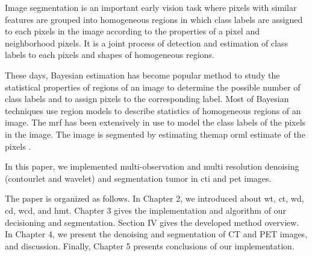 Image segmentation is an important early vision task where pixels with similar features are grouped into homogeneous regions in which  class labels are assigned to each pixels in the image according to the properties of a pixel and neighborhood pixels. It is a joint process of detection and estimation of class labels to each pixels and shapes of homogeneous regions. 

These days, Bayesian estimation has become popular method to study the statistical properties of regions of an image to determine the possible number of class labels and to assign pixels to the corresponding label. Most of Bayesian techniques use region models to describe statistics of homogeneous regions of an image. The \gls{mrf} has been extensively in use to model the class labels of the pixels in the image. The image is segmented by estimating the\gls{map}  or\gls{ml} estimate of the pixels\cite{choi1999image} \cite{voisin2014supervised}.

In this paper, we implemented  multi-observation and multi resolution  denoising (contourlet and wavelet) and segmentation tumor in \gls{cti} and \gls{pet} images.

The paper is organized as follows. In Chapter 2, we introduced about \gls{wt}, \gls{ct}, \gls{wd}, \gls{cd}, \gls{wcd}, and \gls{hmt}. Chapter 3 gives the implementation and algorithm of our decisioning and segmentation. Section IV gives the developed method overview. In Chapter 4, we present the denoising and segmentation of CT and PET images, and discussion. Finally, Chapter 5 presents conclusions of our implementation.

